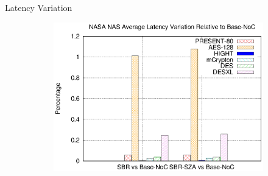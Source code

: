 \begin{frame}{Latency Variation}
\begin{center}
\begin{figure}
\begin{subfigure}{0.49\linewidth}
				\includegraphics[width=1.0\linewidth]{charts/nasa/nasa-path-cost-comparison-relative.eps}
			\end{subfigure}
		\end{figure}
	\end{center}
\end{frame}

